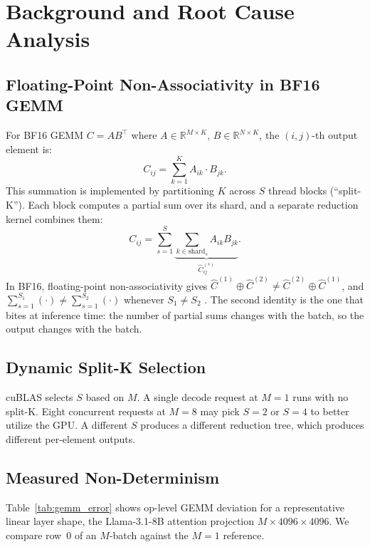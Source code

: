 \documentclass{article}
\begin{document}
\section{Background and Root Cause Analysis}
\label{sec:background}

\subsection{Floating-Point Non-Associativity in BF16 GEMM}

For BF16 GEMM $C = AB^\top$ where $A \in \mathbb{R}^{M \times K}$,
$B \in \mathbb{R}^{N \times K}$, the $(i,j)$-th output element is:
\begin{equation}
  C_{ij} = \sum_{k=1}^{K} A_{ik} \cdot B_{jk}.
  \label{eq:gemm}
\end{equation}
This summation is implemented by partitioning $K$ across $S$ thread blocks
(``split-K''). Each block computes a partial sum over its shard, and a separate
reduction kernel combines them:
\begin{equation}
  C_{ij} = \sum_{s=1}^{S} \underbrace{\sum_{k \in \text{shard}_s} A_{ik} B_{jk}}_{\hat{C}_{ij}^{(s)}}.
\end{equation}
In BF16, floating-point non-associativity gives
$\hat{C}^{(1)} \oplus \hat{C}^{(2)} \ne \hat{C}^{(2)} \oplus \hat{C}^{(1)}$, and
$\sum_{s=1}^{S_1}(\cdot) \ne \sum_{s=1}^{S_2}(\cdot)$ whenever $S_1 \ne S_2$
\citep{goldberg1991fp,ieee754}. The second identity is the one that bites at inference
time: the number of partial sums changes with the batch, so the output changes with
the batch.

\subsection{Dynamic Split-K Selection}

cuBLAS selects $S$ based on $M$. A single decode request at $M\!=\!1$ runs with no
split-K. Eight concurrent requests at $M\!=\!8$ may pick $S\!=\!2$ or $S\!=\!4$ to
better utilize the GPU. A different $S$ produces a different reduction tree, which
produces different per-element outputs.

\subsection{Measured Non-Determinism}
\label{sec:measurement}

Table~\ref{tab:gemm_error} shows op-level GEMM deviation for a representative linear
layer shape, the Llama-3.1-8B attention projection $M\times4096\times4096$. We
compare row~0 of an $M$-batch against the $M\!=\!1$ reference.
\end{document}
